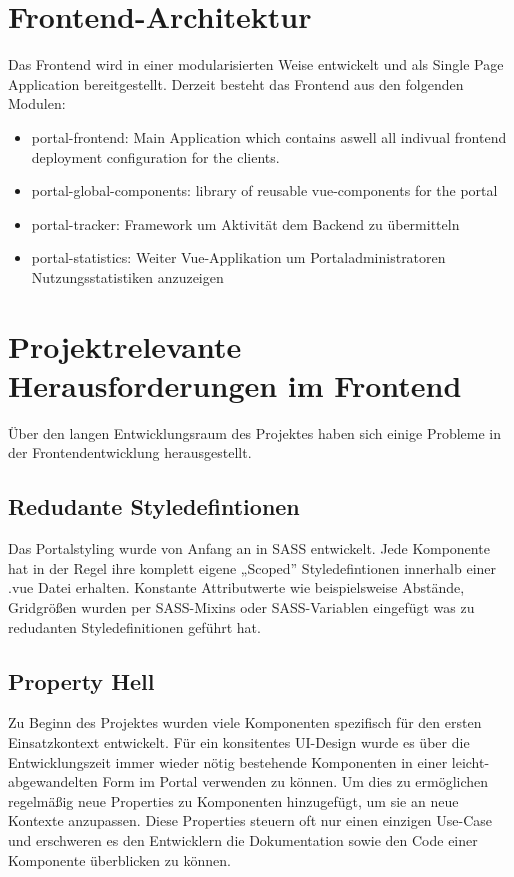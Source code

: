 \section{Frontend-Architektur}
Das Frontend wird in einer modularisierten Weise entwickelt und als Single Page Application bereitgestellt. Derzeit besteht das Frontend aus den folgenden Modulen:
\begin{itemize}
  \item portal-frontend: Main Application which contains aswell all indivual frontend deployment configuration for the clients.
  \item portal-global-components: library of reusable vue-components for the portal
  \item portal-tracker: Framework um Aktivität dem Backend zu übermitteln
  \item portal-statistics: Weiter Vue-Applikation um Portaladministratoren Nutzungsstatistiken anzuzeigen
\end{itemize}

\section{Projektrelevante Herausforderungen im Frontend}
Über den langen Entwicklungsraum des Projektes haben sich einige Probleme in der Frontendentwicklung herausgestellt.

\subsection{Redudante Styledefintionen}
Das Portalstyling wurde von Anfang an in SASS entwickelt. Jede Komponente hat in der Regel ihre komplett eigene „Scoped” Styledefintionen innerhalb einer .vue Datei erhalten. Konstante Attributwerte wie beispielsweise Abstände, Gridgrößen wurden per SASS-Mixins oder SASS-Variablen eingefügt was zu redudanten Styledefinitionen geführt hat.

\subsection{Property Hell}
Zu Beginn des Projektes wurden viele Komponenten spezifisch für den ersten Einsatzkontext entwickelt. Für ein konsitentes UI-Design wurde es über die Entwicklungszeit immer wieder nötig bestehende Komponenten in einer leicht-abgewandelten Form im Portal verwenden zu können. Um dies zu ermöglichen regelmäßig neue Properties zu Komponenten hinzugefügt, um sie an neue Kontexte anzupassen. Diese Properties steuern oft nur einen einzigen Use-Case und erschweren es den Entwicklern die Dokumentation sowie den Code einer Komponente überblicken zu können.

